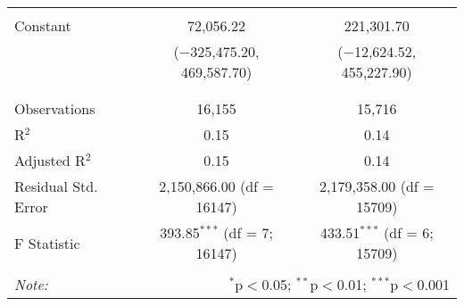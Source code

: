 \begin{table}[!htbp]
\begin{tabular}{@{\extracolsep{5pt}}lcc}
  & & \\ 
 Constant & 72,056.22 & 221,301.70 \\ 
  & ($-$325,475.20, 469,587.70) & ($-$12,624.52, 455,227.90) \\ 
  & & \\ 
\hline \\[-1.8ex] 
Observations & 16,155 & 15,716 \\ 
R$^{2}$ & 0.15 & 0.14 \\ 
Adjusted R$^{2}$ & 0.15 & 0.14 \\ 
Residual Std. Error & 2,150,866.00 (df = 16147) & 2,179,358.00 (df = 15709) \\ 
F Statistic & 393.85$^{***}$ (df = 7; 16147) & 433.51$^{***}$ (df = 6; 15709) \\ 
\hline 
\hline \\[-1.8ex] 
\textit{Note:}  & \multicolumn{2}{r}{$^{*}$p$<$0.05; $^{**}$p$<$0.01; $^{***}$p$<$0.001} \\ 
\end{tabular} 
\end{table} 
